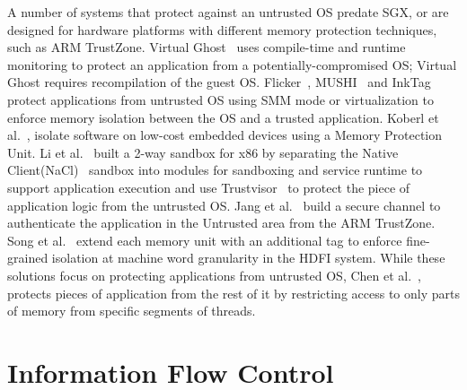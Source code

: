 
A number of systems that protect against an untrusted OS predate SGX, or are designed for hardware platforms with different memory protection techniques, such as ARM TrustZone.
Virtual Ghost~\citep{criswell2014virtualghost} uses compile-time and runtime monitoring to protect an application
from a potentially-compromised OS; Virtual Ghost requires recompilation of the guest OS.
Flicker~\citep{flicker}, MUSHI~\citep{zhang2012mushi} and InkTag~\citep{inktag} protect applications from untrusted OS using SMM mode or virtualization
to enforce memory isolation between the OS and a trusted application.
Koberl et al.~\citep{koeberl2014trustlite}, isolate software on low-cost embedded devices using a Memory Protection Unit.
Li et al.~\citep{li2014minibox} built a 2-way sandbox for x86 by separating the Native Client(NaCl)~\citep{yee2009native} sandbox into modules for sandboxing and service runtime to support application execution and use Trustvisor~\citep{trustvisor} to protect the piece of application logic from the untrusted OS.
Jang et al.~\citep{jang2015secret} build a secure channel to authenticate the application in the Untrusted area from the ARM TrustZone.
Song et al.~\citep{songhdfi} extend each memory unit with an additional tag
to enforce fine-grained isolation at machine word granularity in the HDFI system.
While these solutions focus on protecting applications from untrusted OS, Chen et  al.~\citep{chenshreds}, protects pieces of application from the rest of it by restricting access to only parts of memory from specific segments of threads.



\section{Information Flow Control}

